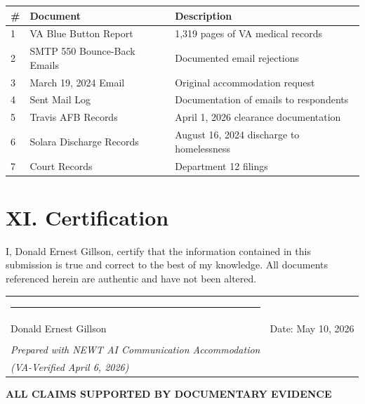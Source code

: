 \documentclass[11pt, a4paper]{article}
\begin{document}
\begin{center}
\begin{tabular}{p{0.5cm}p{5cm}p{6cm}}
\toprule
\textbf{\#} & \textbf{Document} & \textbf{Description} \\
\midrule
1 & VA Blue Button Report & 1,319 pages of VA medical records \\
2 & SMTP 550 Bounce-Back Emails & Documented email rejections \\
3 & March 19, 2024 Email & Original accommodation request \\
4 & Sent Mail Log & Documentation of emails to respondents \\
5 & Travis AFB Records & April 1, 2026 clearance documentation \\
6 & Solara Discharge Records & August 16, 2024 discharge to homelessness \\
7 & Court Records & Department 12 filings \\
\bottomrule
\end{tabular}
\end{center}

\vspace{0.5cm}

\section{XI. Certification}

I, Donald Ernest Gillson, certify that the information contained in this submission is true and correct to the best of my knowledge. All documents referenced herein are authentic and have not been altered.

\vspace{1cm}
\begin{tabular}{p{8cm}r}
    \rule{7cm}{0.4pt} & \\
    Donald Ernest Gillson & Date: May 10, 2026 \\
    & \\
    \textit{Prepared with NEWT AI Communication Accommodation} & \\
    \textit{(VA-Verified April 6, 2026)} &
\end{tabular}

\vspace{1cm}

\begin{center}
\textbf{ALL CLAIMS SUPPORTED BY DOCUMENTARY EVIDENCE}
\end{center}
\end{document}
